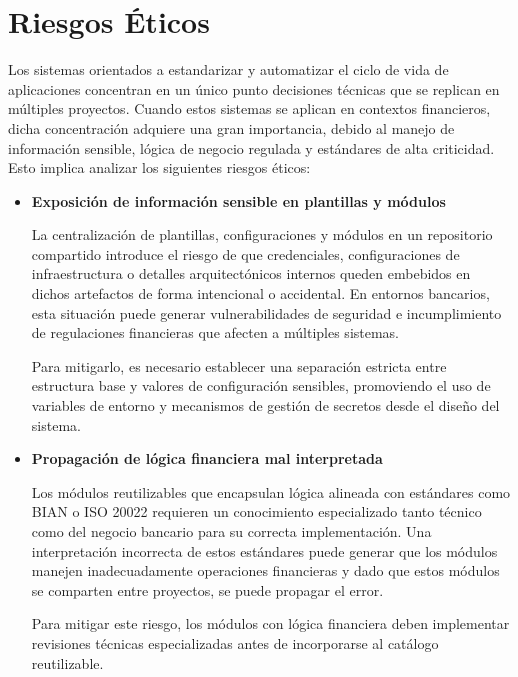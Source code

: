 
\section{Riesgos Éticos}

Los sistemas orientados a estandarizar y automatizar el ciclo de vida de aplicaciones concentran en un único punto decisiones técnicas que se replican en múltiples proyectos. Cuando estos sistemas se aplican en contextos financieros, dicha concentración adquiere una gran importancia, debido al manejo de información sensible, lógica de negocio regulada y estándares de alta criticidad. Esto implica analizar los siguientes riesgos éticos:

\begin{itemize}

    \item \textbf{Exposición de información sensible en plantillas y módulos}  
    
    La centralización de plantillas, configuraciones y módulos en un repositorio compartido introduce el riesgo de que credenciales, configuraciones de infraestructura o detalles arquitectónicos internos queden embebidos en dichos artefactos de forma intencional o accidental. En entornos bancarios, esta situación puede generar vulnerabilidades de seguridad e incumplimiento de regulaciones financieras que afecten a múltiples sistemas. 
    
    Para mitigarlo, es necesario establecer una separación estricta entre estructura base y valores de configuración sensibles, promoviendo el uso de variables de entorno y mecanismos de gestión de secretos desde el diseño del sistema.
    
    \item \textbf{Propagación de lógica financiera mal interpretada}  
    
    Los módulos reutilizables que encapsulan lógica alineada con estándares como BIAN o ISO 20022 requieren un conocimiento especializado tanto técnico como del negocio bancario para su correcta implementación. Una interpretación incorrecta de estos estándares puede generar que los módulos manejen inadecuadamente operaciones financieras y dado que estos módulos se comparten entre proyectos, se puede propagar el error. 
    
    Para mitigar este riesgo, los módulos con lógica financiera deben implementar revisiones técnicas especializadas antes de incorporarse al catálogo reutilizable.
    

\end{itemize}
